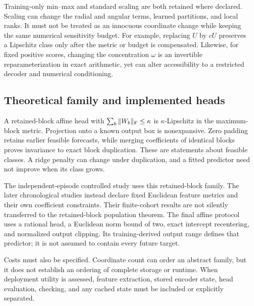 Training-only min--max and standard scaling are both retained where declared. Scaling can change the radial and angular terms, learned partitions, and local ranks. It must not be treated as an innocuous coordinate change while keeping the same numerical sensitivity budget. For example, replacing $U$ by $cU$ preserves a Lipschitz class only after the metric or budget is compensated. Likewise, for fixed positive scores, changing the concentration $\omega$ is an invertible reparameterization in exact arithmetic, yet can alter accessibility to a restricted decoder and numerical conditioning.

\subsection{Theoretical family and implemented heads}
A retained-block affine head with $\sum_b\|W_b\|_{\rm F}\leq\kappa$ is $\kappa$-Lipschitz in the maximum-block metric. Projection onto a known output box is nonexpansive. Zero padding retains earlier feasible forecasts, while merging coefficients of identical blocks proves invariance to exact block duplication. These are statements about feasible classes. A ridge penalty can change under duplication, and a fitted predictor need not improve when its class grows.

The independent-episode controlled study uses this retained-block family. The later chronological studies instead declare fixed Euclidean feature metrics and their own coefficient constraints. Their finite-cohort results are not silently transferred to the retained-block population theorem. The final affine protocol uses a rational head, a Euclidean norm bound of two, exact intercept recentering, and normalized output clipping. Its training-derived output range defines that predictor; it is not assumed to contain every future target.

Costs must also be specified. Coordinate count can order an abstract family, but it does not establish an ordering of complete storage or runtime. When deployment utility is assessed, feature extraction, stored encoder state, head evaluation, checking, and any cached state must be included or explicitly separated.

